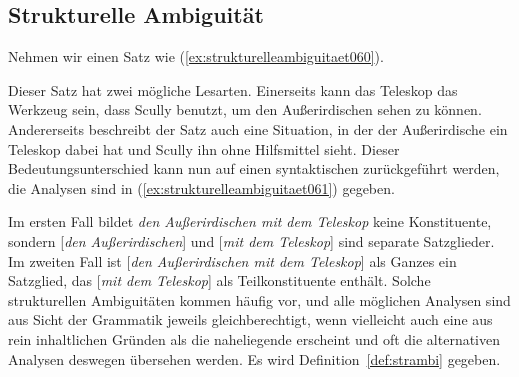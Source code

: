 \subsection{Strukturelle Ambiguität}
\label{sec:strukturelleambiguitaet}

Nehmen wir einen Satz wie (\ref{ex:strukturelleambiguitaet060}).

\begin{exe}
\end{exe}

Dieser Satz hat zwei mögliche Lesarten.
Einerseits kann das Teleskop das Werkzeug sein, dass Scully benutzt, um den Außerirdischen sehen zu können.
Andererseits beschreibt der Satz auch eine Situation, in der der Außerirdische ein Teleskop dabei hat und Scully ihn ohne Hilfsmittel sieht.
Dieser Bedeutungsunterschied kann nun auf einen syntaktischen zurückgeführt werden, die Analysen sind in (\ref{ex:strukturelleambiguitaet061}) gegeben.

\begin{exe}
  \ex\label{ex:strukturelleambiguitaet061}
  \begin{xlist}
  \end{xlist}
\end{exe}

Im ersten Fall bildet \textit{den Außerirdischen mit dem Teleskop} keine Konstituente, sondern [\textit{den Außerirdischen}] und [\textit{mit dem Teleskop}] sind separate Satzglieder.
Im zweiten Fall ist [\textit{den Außerirdischen mit dem Teleskop}] als Ganzes ein Satzglied, das [\textit{mit dem Teleskop}] als Teilkonstituente enthält.
Solche strukturellen Ambiguitäten kommen häufig vor, und alle möglichen Analysen sind aus Sicht der Grammatik jeweils gleichberechtigt, wenn vielleicht auch eine aus rein inhaltlichen Gründen als die naheliegende erscheint und oft die alternativen Analysen deswegen übersehen werden.
Es wird Definition~\ref{def:strambi} gegeben.


